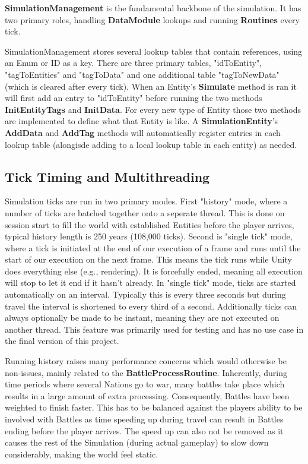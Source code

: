 \documentclass{report}
\begin{document}
\textbf{SimulationManagement} is the fundamental backbone of the simulation. It has two primary roles, handling \textbf{DataModule} lookups and running \textbf{Routines} every tick.

SimulationManagement stores several lookup tables that contain references, using an Enum or ID as a key. There are three primary tables, "idToEntity", "tagToEntities" and "tagToData" and one additional table "tagToNewData" (which is cleared after every tick). When an Entity's \textbf{Simulate} method is ran it will first add an entry to "idToEntity" before running the two methods \textbf{InitEntityTags} and \textbf{InitData}. For every new type of Entity those two methods are implemented to define what that Entity is like.
A \textbf{SimulationEntity}'s \textbf{AddData} and \textbf{AddTag} methods will automatically register entries in each lookup table (alongisde adding to a local lookup table in each entity) as needed.

\subsection{Tick Timing and Multithreading}

Simulation ticks are run in two primary modes. First "history" mode, where a number of ticks are batched together onto a seperate thread. This is done on session start to fill the world with established Entities before the player arrives, typical history length is 250 years (108,000 ticks). 
Second is "single tick" mode, where a tick is initiated at the end of our execution of a frame and runs until the start of our execution on the next frame. This means the tick runs while Unity does everything else (e.g., rendering). It is forcefully ended, meaning all execution will stop to let it end if it hasn't already. In "single tick" mode, ticks are started automatically on an interval. Typically this is every three seconds but during travel the interval is shortened to every third of a second.
Additionally ticks can always optionally be made to be instant, meaning they are not executed on another thread. This feature was primarily used for testing and has no use case in the final version of this project.

Running history raises many performance concerns which would otherwise be non-issues, mainly related to the \textbf{BattleProcessRoutine}. Inherently, during time periods where several Nations go to war, many battles take place which results in a large amount of extra processing. Consequently, Battles have been weighted to finish faster. This has to be balanced against the players ability to be involved with Battles as time speeding up during travel can result in Battles ending before the player arrives. The speed up can also not be removed as it causes the rest of the Simulation (during actual gameplay) to slow down considerably, making the world feel static.
\end{document}
